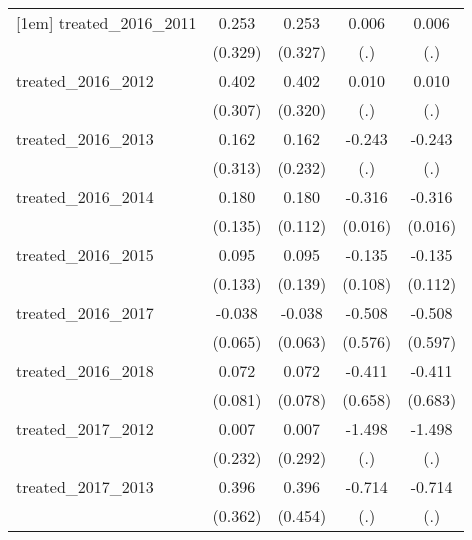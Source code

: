 {\begin{tabular}{l*{4}{c}}
[1em]
treated\_2016\_2011&       0.253         &       0.253         &       0.006         &       0.006         \\
            &     (0.329)         &     (0.327)         &         (.)         &         (.)         \\
[1em]
treated\_2016\_2012&       0.402         &       0.402         &       0.010         &       0.010         \\
            &     (0.307)         &     (0.320)         &         (.)         &         (.)         \\
[1em]
treated\_2016\_2013&       0.162         &       0.162         &      -0.243         &      -0.243         \\
            &     (0.313)         &     (0.232)         &         (.)         &         (.)         \\
[1em]
treated\_2016\_2014&       0.180         &       0.180         &      -0.316\sym{***}&      -0.316\sym{***}\\
            &     (0.135)         &     (0.112)         &     (0.016)         &     (0.016)         \\
[1em]
treated\_2016\_2015&       0.095         &       0.095         &      -0.135         &      -0.135         \\
            &     (0.133)         &     (0.139)         &     (0.108)         &     (0.112)         \\
[1em]
treated\_2016\_2017&      -0.038         &      -0.038         &      -0.508         &      -0.508         \\
            &     (0.065)         &     (0.063)         &     (0.576)         &     (0.597)         \\
[1em]
treated\_2016\_2018&       0.072         &       0.072         &      -0.411         &      -0.411         \\
            &     (0.081)         &     (0.078)         &     (0.658)         &     (0.683)         \\
[1em]
treated\_2017\_2012&       0.007         &       0.007         &      -1.498         &      -1.498         \\
            &     (0.232)         &     (0.292)         &         (.)         &         (.)         \\
[1em]
treated\_2017\_2013&       0.396         &       0.396         &      -0.714         &      -0.714         \\
            &     (0.362)         &     (0.454)         &         (.)         &         (.)         \\

\end{tabular}}
